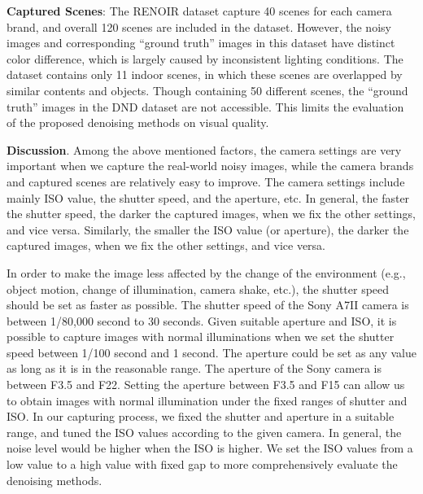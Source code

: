 \textbf{Captured Scenes}: The RENOIR dataset \cite{RENOIR2014} capture 40 scenes for each camera brand, and overall 120 scenes are included in the dataset. However, the noisy images and corresponding ``ground truth'' images in this dataset have distinct color difference, which is largely caused by inconsistent lighting conditions. The dataset \cite{crosschannel2016} contains only 11 indoor scenes, in which these scenes are overlapped by similar contents and objects. Though containing 50 different scenes, the ``ground truth'' images in the DND dataset \cite{dnd2017} are not accessible. This limits the evaluation of the proposed denoising methods on visual quality.


\textbf{Discussion}. Among the above mentioned factors, the camera settings are very important when we capture the real-world noisy images, while the camera brands and captured scenes are relatively easy to improve. The camera settings include mainly ISO value, the shutter speed, and the aperture, etc. In general, the faster the shutter speed, the darker the captured images, when we fix the other settings, and vice versa. Similarly, the smaller the ISO value (or aperture), the darker the captured images, when we fix the other settings, and vice versa. 

In order to make the image less affected by the change of the environment (e.g., object motion, change of illumination, camera shake, etc.), the shutter speed should be set as faster as possible. The shutter speed of the Sony A7II camera is between 1/80,000 second to 30 seconds. Given suitable aperture and ISO, it is possible to capture images with normal illuminations when we set the shutter speed between 1/100 second and 1 second. The aperture could be set as any value as long as it is in the reasonable range. The aperture of the Sony camera is between F3.5 and F22. Setting the aperture between F3.5 and F15 can allow us to obtain images with normal illumination under the fixed ranges of shutter and ISO. In our capturing process, we fixed the shutter and aperture in a suitable range, and tuned the ISO values according to the given camera. In general, the noise level would be higher when the ISO is higher. We set the ISO values from a low value to a high value with fixed gap to more comprehensively evaluate the denoising methods.

